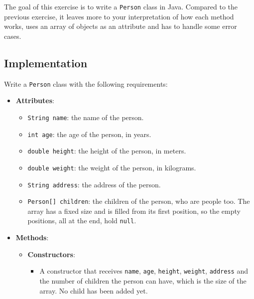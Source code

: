 The goal of this exercise is to write a \texttt{Person} class in Java. Compared to the previous exercise, it leaves more to your interpretation of how each method works, uses an array of objects as an attribute and has to handle some error cases.

\subsection{Implementation}

Write a \texttt{Person} class with the following requirements:

\begin{itemize}

    \item \textbf{Attributes}:

        \begin{itemize}

            \item \texttt{String name}: the name of the person.

            \item \texttt{int age}: the age of the person, in years.

            \item \texttt{double height}: the height of the person, in meters.

            \item \texttt{double weight}: the weight of the person, in kilograms.

            \item \texttt{String address}: the address of the person.

            \item \texttt{Person[] children}: the children of the person, who are people too. The array has a fixed size and is filled from its first position, so the empty positions, all at the end, hold \texttt{null}.

        \end{itemize}

    \item \textbf{Methods}:

        \begin{itemize}

            \item \textbf{Constructors}:

                \begin{itemize}

                    \item A constructor that receives \texttt{name}, \texttt{age}, \texttt{height}, \texttt{weight}, \texttt{address} and the number of children the person can have, which is the size of the array. No child has been added yet.


\end{itemize}
\end{itemize}
\end{itemize}
